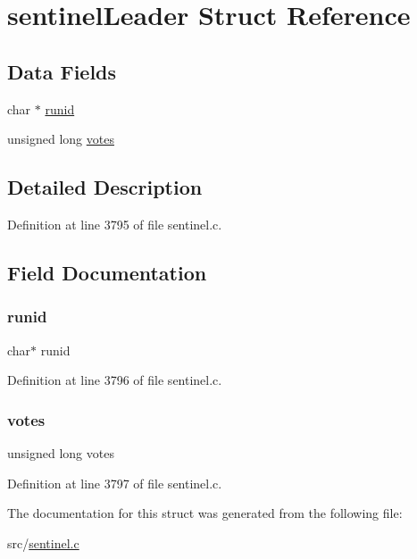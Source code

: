 \hypertarget{structsentinel_leader}{}\section{sentinel\+Leader Struct Reference}
\label{structsentinel_leader}
\subsection*{Data Fields}
\begin{DoxyCompactItemize}
\item 
char $\ast$ \hyperlink{structsentinel_leader_a79643793f84ca3b8331db57a3cf40ba6}{runid}
\item 
unsigned long \hyperlink{structsentinel_leader_ac65d75d48bc3bbf268031e1a78b53307}{votes}
\end{DoxyCompactItemize}


\subsection{Detailed Description}


Definition at line 3795 of file sentinel.\+c.



\subsection{Field Documentation}
\mbox{\label{structsentinel_leader_a79643793f84ca3b8331db57a3cf40ba6}} 
\subsubsection{\texorpdfstring{runid}{runid}}
{\footnotesize\ttfamily char$\ast$ runid}



Definition at line 3796 of file sentinel.\+c.

\mbox{\label{structsentinel_leader_ac65d75d48bc3bbf268031e1a78b53307}} 
\subsubsection{\texorpdfstring{votes}{votes}}
{\footnotesize\ttfamily unsigned long votes}



Definition at line 3797 of file sentinel.\+c.



The documentation for this struct was generated from the following file\+:\begin{DoxyCompactItemize}
\item 
src/\hyperlink{sentinel_8c}{sentinel.\+c}\end{DoxyCompactItemize}
